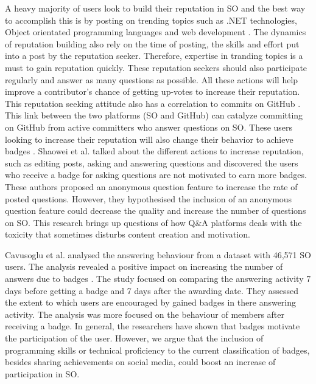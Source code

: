 \documentclass{sigchi}
\begin{document}
A heavy majority of users look to build their reputation in SO and the best way to accomplish this is by posting on trending topics such as .NET technologies, Object orientated programming languages and web development \cite{Bosu}. The dynamics of reputation building also rely on the time of posting, the skills and effort put into a post by the reputation seeker. Therefore, expertise in tranding topics is a must to gain reputation quickly. These reputation seekers should also participate regularly and answer as many questions as possible. All these actions will help improve a contributor's chance of getting up-votes to increase their reputation.  This reputation seeking attitude also has a correlation to commits on GitHub \cite{Vasilescu}. This link between the two platforms (SO and GitHub) can catalyze committing on GitHub from active committers who answer questions on SO. These users looking to increase their reputation will also change their behavior to achieve badges \cite{Wang}.  Shaowei et al. talked about the different actions to increase reputation, such as editing posts, asking and answering questions and discovered the users who receive a badge for asking questions are not motivated to earn more badges. These authors proposed an anonymous question feature to increase the rate of posted questions. However, they hypothesised the inclusion of an anonymous question feature could decrease the quality and increase the number of questions on SO. This research brings up questions of how Q\&A platforms deals with the toxicity that sometimes disturbs content creation and motivation.

Cavusoglu et al. analysed the answering behaviour from a dataset with 46,571 SO users. The analysis revealed a positive impact on increasing the number of answers due to badges \cite{Cavusoglu}. The study focused on comparing the answering activity 7 days before getting a badge and 7 days after the awarding date. They assessed the extent to which users are encouraged by gained badges in there answering activity. The analysis was more focused on the behaviour of members after receiving a badge. In general, the researchers have shown that badges motivate the participation of the user. However, we argue that the inclusion of programming skills or technical proficiency to the current classification of badges, besides sharing achievements on social media, could boost an increase of participation in SO.
\end{document}
